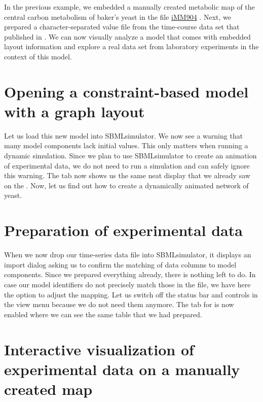In the previous example, we embedded a manually created metabolic map of the central carbon metabolism of baker's yeast in the \SBML file \href{https://identifiers.org/bigg.model/iMM904}{iMM904} \citep{Mo2009}.
Next, we prepared a character-separated value file from the time-course data set that \citeauthor{Bergdahl2012} published in \citeyear{Bergdahl2012}.
We can now visually analyze a model that comes with embedded layout information and explore a real data set from laboratory experiments in the context of this model.

\section{Opening a constraint-based model with a graph layout}

Let us load this new model into SBMLsimulator.
We now see a warning that many model components lack initial values.
This only matters when running a dynamic simulation.
Since we plan to use SBMLsimulator to create an animation of experimental data, we do not need to run a simulation and can safely ignore this warning.
The  tab now shows us the same neat display that we already saw on the \BiGG \citep{King2015b, Norsigian2019}.
Now, let us find out how to create a dynamically animated network of yeast.

\section{Preparation of experimental data}

When we now drop our time-series data file into SBMLsimulator, it displays an import dialog asking us to confirm the matching of data columns to model components.
Since we prepared everything already, there is nothing left to do. In case our model identifiers do not precisely match those in the \CSV file, we have here the option to adjust the mapping.
Let us switch off the status bar and controls in the view menu because we do not need them anymore.
The tab for  is now enabled where we can see the same table that we had prepared.

\section{Interactive visualization of experimental data on a manually created map}

